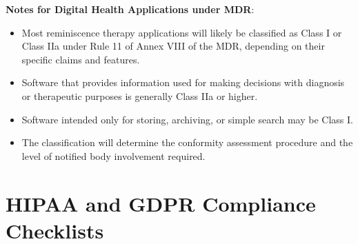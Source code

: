 \begin{tcolorbox}[title=European MDR Documentation Checklist for Digital Health Applications]
\textbf{Notes for Digital Health Applications under MDR}:
\begin{itemize}
    \item Most reminiscence therapy applications will likely be classified as Class I or Class IIa under Rule 11 of Annex VIII of the MDR, depending on their specific claims and features.
    
    \item Software that provides information used for making decisions with diagnosis or therapeutic purposes is generally Class IIa or higher.
    
    \item Software intended only for storing, archiving, or simple search may be Class I.
    
    \item The classification will determine the conformity assessment procedure and the level of notified body involvement required.
\end{itemize}
\end{tcolorbox}

\section{HIPAA and GDPR Compliance Checklists}

